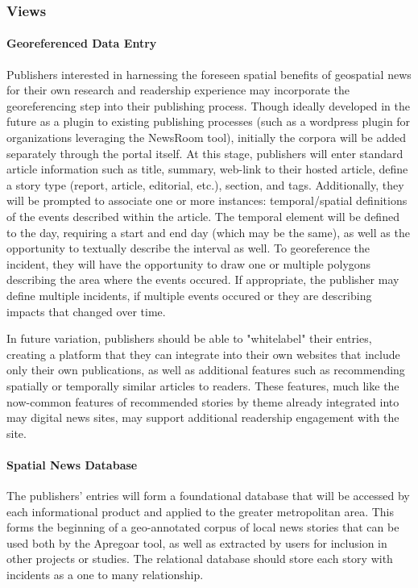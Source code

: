 \subsubsection{Views}
\paragraph{Georeferenced Data Entry}
Publishers interested in harnessing the foreseen spatial benefits of geospatial news for their own research and readership experience may incorporate the georeferencing step into their publishing process. Though ideally developed in the future as a plugin to existing publishing processes (such as a wordpress plugin for organizations leveraging the NewsRoom tool), initially the corpora will be added separately through the portal itself. At this stage, publishers will enter standard article information such as title, summary, web-link to their hosted article, define a story type (report, article, editorial, etc.), section, and tags. Additionally, they will be prompted to associate one or more instances: temporal/spatial definitions of the events described within the article. The temporal element will be defined to the day, requiring a start and end day (which may be the same), as well as the opportunity to textually describe the interval as well.  To georeference the incident, they will have the opportunity to draw one or multiple polygons describing the area where the events occured. If appropriate, the publisher may define multiple incidents, if multiple events occured or they are describing impacts that changed over time.

In future variation, publishers should be able to "whitelabel" their entries, creating a platform that they can integrate into their own websites that include only their own publications, as well as additional features such as recommending spatially or temporally similar articles to readers. These features, much like the now-common features of recommended stories by theme already integrated into may digital news sites, may support additional readership engagement with the site.



\paragraph{Spatial News Database}
The publishers' entries will form a foundational database that will be accessed by each informational product and applied to the greater metropolitan area. This forms the beginning of a geo-annotated corpus of local news stories that can be used both by the Apregoar tool, as well as extracted by users for inclusion in other projects or studies. %
The relational database should store each story with incidents as a one to many relationship. 

